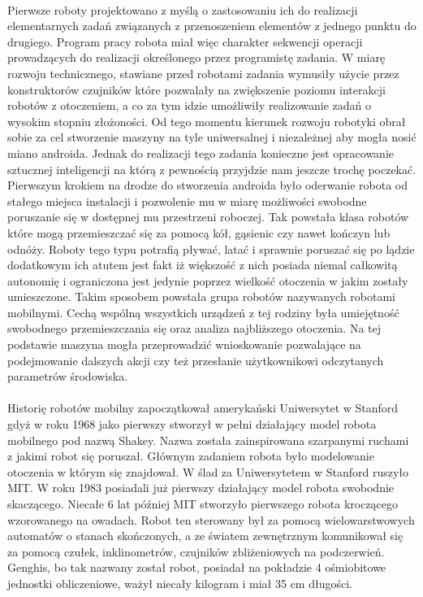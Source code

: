 \\
Pierwsze roboty projektowano z myślą o zastosowaniu ich do realizacji
elementarnych zadań związanych z przenoszeniem elementów z jednego punktu do
drugiego. Program pracy robota miał więc charakter sekwencji operacji
prowadzących do realizacji określonego przez programistę zadania. W miarę
rozwoju technicznego, stawiane przed robotami zadania wymusiły użycie przez
konstruktorów czujników które pozwalały na zwiększenie poziomu interakcji
robotów z otoczeniem, a co za tym idzie umożliwiły realizowanie zadań o wysokim
stopniu złożoności. Od tego momentu kierunek rozwoju robotyki obrał
sobie za cel stworzenie maszyny na tyle uniwersalnej i niezależnej aby mogła
nosić miano androida. Jednak do realizacji tego zadania konieczne jest
opracowanie sztucznej inteligencji na którą z pewnością przyjdzie nam jeszcze
trochę poczekać. 
\newpage
Pierwszym krokiem na drodze do stworzenia androida było oderwanie robota od
stałego miejsca instalacji i pozwolenie mu w miarę możliwości swobodne
poruszanie się w dostępnej mu przestrzeni roboczej. Tak powstała klasa robotów
które mogą przemieszczać się za pomocą kół, gąsienic czy nawet kończyn lub
odnóży. Roboty tego typu potrafią pływać, latać i sprawnie poruszać się
po lądzie dodatkowym ich atutem jest fakt iż większość z nich posiada niemal
całkowitą autonomię i ograniczona jest jedynie poprzez wielkość otoczenia w
jakim zostały umieszczone. Takim sposobem powstała grupa robotów
nazywanych robotami mobilnymi. Cechą wspólną wszystkich urządzeń z tej rodziny
była umiejętność swobodnego przemieszczania się oraz analiza najbliższego
otoczenia. Na tej podstawie maszyna mogła przeprowadzić wnioskowanie pozwalające
na podejmowanie dalszych akcji czy też przesłanie użytkownikowi odczytanych
parametrów środowiska.\\
\\
Historię robotów mobilny zapoczątkował amerykański Uniwersytet w Stanford gdyż
w roku 1968 jako pierwszy stworzył w pełni działający model robota mobilnego pod
nazwą Shakey. Nazwa została zainspirowana szarpanymi ruchami z jakimi robot się
poruszał. Głównym zadaniem robota było modelowanie otoczenia w którym się
znajdował. W ślad za Uniwersytetem w Stanford ruszyło MIT. W roku 1983 posiadali
już pierwszy działający model robota swobodnie skaczącego. Niecałe 6
lat później MIT stworzyło pierwszego robota kroczącego wzorowanego na owadach.
Robot ten sterowany był za pomocą wielowarstwowych automatów o stanach
skończonych, a ze światem zewnętrznym komunikował się za pomocą czułek,
inklinometrów, czujników zbliżeniowych na podczerwień. Genghis, bo tak
nazwany został robot, posiadał na pokładzie 4 ośmiobitowe jednostki obliczeniowe, ważył
niecały kilogram i miał 35 cm długości.


